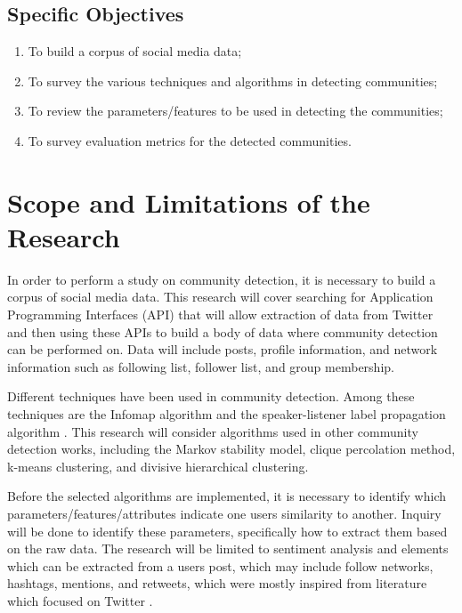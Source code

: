 \subsection{Specific Objectives}
\label{sec:specificobjectives}


\begin{enumerate}
	\item To build a corpus of social media data;
	\item To survey the various techniques and algorithms in detecting communities;
	\item To review the parameters/features to be used in detecting the communities;
	\item To survey evaluation metrics for the detected communities.
\end{enumerate}


\section{Scope and Limitations of the Research}
\label{sec:scopelimitations}


In order to perform a study on community detection, it is necessary to build a corpus of social media data. This research will cover searching for Application Programming Interfaces (API) that will allow extraction of data from Twitter and then using these APIs to build a body of data where community detection can be performed on. Data will include posts, profile information, and network information such as following list, follower list, and group membership.


Different techniques have been used in community detection. Among these techniques are the Infomap algorithm and the speaker-listener label propagation algorithm \cite{Deitrick:2013}.  This research will consider algorithms used in other community detection works, including the Markov stability model, clique percolation method, k-means clustering, and divisive hierarchical clustering.


Before the selected algorithms are implemented, it is necessary to identify which parameters/features/attributes indicate one user\vtick s similarity to another. Inquiry will be done to identify these parameters, specifically how to extract them based on the raw data. The research will be limited to sentiment analysis and elements which can be extracted from a user\vtick s post, which may include follow networks, hashtags, mentions, and retweets, which were mostly inspired from literature which focused on Twitter \cite{Deitrick:2013,Zhang:2012,Lim:2012:1}. 


